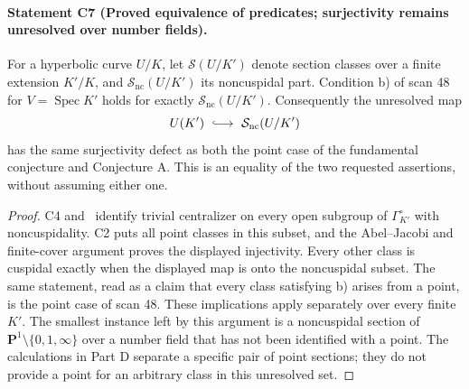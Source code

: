 \paragraph{Statement C7 (Proved equivalence of predicates; surjectivity remains unresolved over number fields).}\label{res:C7}
For a hyperbolic curve $U/K$, let $\mathcal S(U/K')$ denote section classes over a finite extension $K'/K$, and $\mathcal S_{\mathrm{nc}}(U/K')$ its noncuspidal part. Condition b) of scan 48 for $V=\operatorname{Spec}K'$ holds for exactly $\mathcal S_{\mathrm{nc}}(U/K')$. Consequently the unresolved map
\[
 U(K')\ \lhook\joinrel\longrightarrow\ \mathcal S_{\mathrm{nc}}(U/K')
\]
has the same surjectivity defect as both the point case of the fundamental conjecture and Conjecture A. This is an equality of the two requested assertions, without assuming either one.
\begin{proof}
C4 and \Rtwo\ identify trivial centralizer on every open subgroup of $\Gamma_{K'}^\circ$ with noncuspidality. C2 puts all point classes in this subset, and the Abel--Jacobi and finite-cover argument proves the displayed injectivity. Every other class is cuspidal exactly when the displayed map is onto the noncuspidal subset. The same statement, read as a claim that every class satisfying b) arises from a point, is the point case of scan 48. These implications apply separately over every finite $K'$. The smallest instance left by this argument is a noncuspidal section of $\mathbf P^1\setminus\{0,1,\infty\}$ over a number field that has not been identified with a point. The calculations in Part D separate a specific pair of point sections; they do not provide a point for an arbitrary class in this unresolved set.
\end{proof}

